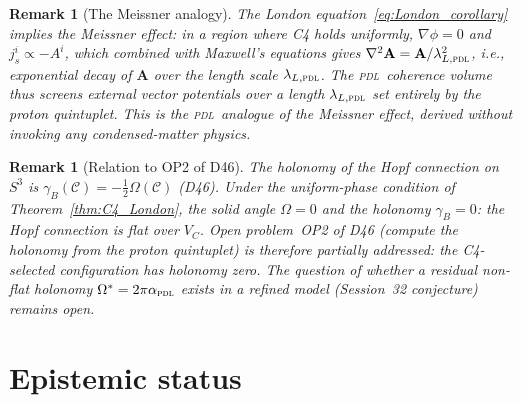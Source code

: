 \documentclass[12pt,a4paper]{article}
\newtheorem{remark}[theorem]{Remark}
\newcommand{\PDL}{\textsc{pdl}}
\newcommand{\Avec}{\mathbf{A}}
\begin{document}
\begin{remark}[The Meissner analogy]
\label{rem:Meissner}
The London equation~\eqref{eq:London_corollary} implies the Meissner effect: in a region where C4 holds uniformly, $\nabla\phi = 0$ and $j^i_s \propto -A^i$, which combined with Maxwell's equations gives $\nabla^2\Avec = \Avec/\lambda_{L,\PDL}^2$, i.e., exponential decay of $\Avec$ over the length scale $\lambda_{L,\PDL}$. The \PDL\ coherence volume thus screens external vector potentials over a length $\lambda_{L,\PDL}$ set entirely by the proton quintuplet. This is the \PDL\ analogue of the Meissner effect, derived without invoking any condensed-matter physics.
\end{remark}

\begin{remark}[Relation to OP2 of D46]
\label{rem:OP2_D46}
The holonomy of the Hopf connection on $S^3$ is $\gamma_B(\mathcal{C}) = -\tfrac{1}{2}\Omega(\mathcal{C})$ (D46). Under the uniform-phase condition of Theorem~\ref{thm:C4_London}, the solid angle $\Omega = 0$ and the holonomy $\gamma_B = 0$: the Hopf connection is flat over $V_C$. Open problem~OP2 of D46 (compute the holonomy from the proton quintuplet) is therefore partially addressed: the C4-selected configuration has holonomy zero. The question of whether a residual non-flat holonomy $\Omega^* = 2\pi\alpha_{\PDL}$ exists in a refined model (Session~32 conjecture) remains open.
\end{remark}

\section{Epistemic status}
\label{sec:epistemic}
\end{document}
